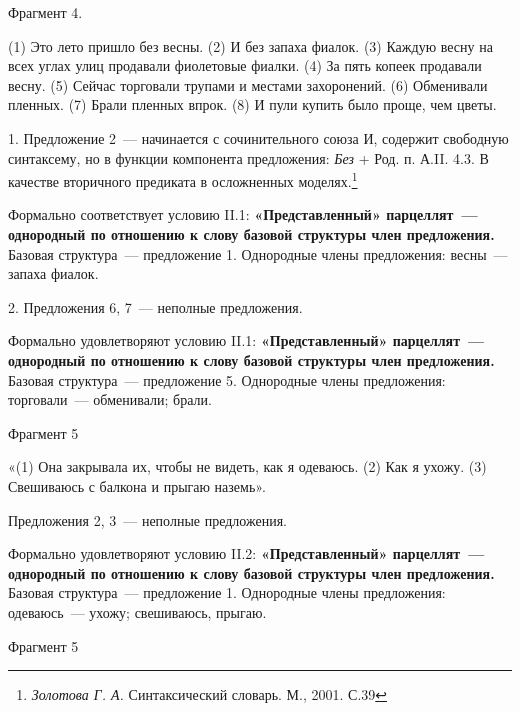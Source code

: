 \documentclass{kursa4}
\begin{document}
    \bigskip

    {Фрагмент 4.}

    {(1) Это лето пришло без весны. (2) И без запаха
    фиалок. (3) Каждую весну на всех углах улиц продавали фиолетовые
    фиалки. (4) За пять копеек продавали весну. (5) Сейчас торговали
    трупами и местами захоронений. (6) Обменивали
    }{пленных. (7) Брали пленных впрок. (8) И пули купить
    было проще, чем цветы.}

    {1. Предложение 2~--- начинается с сочинительного
    союза И, содержит свободную синтаксему, но в функции компонента
    предложения: }\textit{{Без }}{+ Род.
    п.}{ А.II. 4.3. В качестве вторичного предиката в
    осложненных моделях.}\footnote{{
    }\textit{{Золотова Г. А.
    }}{Синтаксический словарь. М., 2001. С.39}}

    {Формально соответствует }{условию
    II.1}{:
    }\textbf{\textcolor[rgb]{0.2,0.2,0.2}{«Представленный» парцеллят~---
    однородный по отношению к слову базовой структуры член предложения.
    }}\textcolor[rgb]{0.2,0.2,0.2}{Базовая структура~--- предложение 1.
    Однородные члены предложения: весны~--- запаха фиалок.}

    \textcolor[rgb]{0.2,0.2,0.2}{2. Предложения 6, 7~--- неполные
    предложения.}

    {Формально
    }{удовлетворяют}{
    }{условию II.1}{:
    }\textbf{\textcolor[rgb]{0.2,0.2,0.2}{«Представленный» парцеллят~---
    однородный по отношению к слову базовой структуры член предложения.
    }}\textcolor[rgb]{0.2,0.2,0.2}{Базовая структура~--- предложение 5.
    Однородные члены предложения: торговали~--- обменивали; брали.}

    \textcolor[rgb]{0.2,0.2,0.2}{Ф}\textcolor[rgb]{0.2,0.2,0.2}{рагмент
    5}

    «(1) Она закрывала их, чтобы не видеть, как я одеваюсь. (2) Как я
    ухожу. (3) Свешиваюсь с балкона и прыгаю наземь».

    Предложения 2, 3~--- неполные предложения. 

    {Формально
    }{удовлетворяют}{
    }{условию }{II.2}{:
    }\textbf{\textcolor[rgb]{0.2,0.2,0.2}{«Представленный» парцеллят~---
    однородный по отношению к слову базовой структуры член предложения.
    }}\textcolor[rgb]{0.2,0.2,0.2}{Базовая структура~--- предложение
    }\textcolor[rgb]{0.2,0.2,0.2}{1}\textcolor[rgb]{0.2,0.2,0.2}{.
    Однородные члены предложения: }\textcolor[rgb]{0.2,0.2,0.2}{одеваюсь~---
    ухожу; свешиваюсь, прыгаю.}

    \textcolor[rgb]{0.2,0.2,0.2}{Фрагмент 5}
\end{document}
